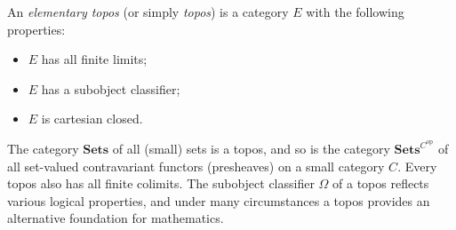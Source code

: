 An \emph{elementary topos} (or simply \emph{topos}) is a category $E$ with the following properties:
\begin{itemize}
  \item[(i)] $E$ has all finite limits;
  \item[(ii)] $E$ has a subobject classifier;
  \item[(iii)] $E$ is cartesian closed.
\end{itemize}
The category $\mathbf{Sets}$ of all (small) sets is a topos, and so is the category $\mathbf{Sets}^{C^{\mathrm{op}}}$ of all set-valued contravariant functors (presheaves) on a small category $C$. Every topos also has all finite colimits. The subobject classifier $\Omega$ of a topos reflects various logical properties, and under many circumstances a topos provides an alternative foundation for mathematics.
